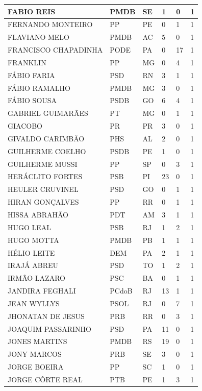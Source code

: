 \begin{apendicesenv}
\begin{longtable}{|L{4cm}|C{2cm}|C{1cm}|C{2cm}|C{1cm}|C{2cm}|}
FABIO REIS & PMDB & SE & 1 & 0 & 1 \\ \hline
FERNANDO MONTEIRO & PP & PE & 0 & 1 & 1 \\ \hline
FLAVIANO MELO & PMDB & AC & 5 & 0 & 1 \\ \hline
FRANCISCO CHAPADINHA & PODE & PA & 0 & 17 & 1 \\ \hline
FRANKLIN & PP & MG & 0 & 4 & 1 \\ \hline
FÁBIO FARIA & PSD & RN & 3 & 1 & 1 \\ \hline
FÁBIO RAMALHO & PMDB & MG & 3 & 0 & 1 \\ \hline
FÁBIO SOUSA & PSDB & GO & 6 & 4 & 1 \\ \hline
GABRIEL GUIMARÃES & PT & MG & 0 & 1 & 1 \\ \hline
GIACOBO & PR & PR & 3 & 0 & 1 \\ \hline
GIVALDO CARIMBÃO & PHS & AL & 2 & 0 & 1 \\ \hline
GUILHERME COELHO & PSDB & PE & 1 & 0 & 1 \\ \hline
GUILHERME MUSSI & PP & SP & 0 & 3 & 1 \\ \hline
HERÁCLITO FORTES & PSB & PI & 23 & 0 & 1 \\ \hline
HEULER CRUVINEL & PSD & GO & 0 & 1 & 1 \\ \hline
HIRAN GONÇALVES & PP & RR & 0 & 1 & 1 \\ \hline
HISSA ABRAHÃO & PDT & AM & 3 & 1 & 1 \\ \hline
HUGO LEAL & PSB & RJ & 1 & 2 & 1 \\ \hline
HUGO MOTTA & PMDB & PB & 1 & 1 & 1 \\ \hline
HÉLIO LEITE & DEM & PA & 2 & 1 & 1 \\ \hline
IRAJÁ ABREU & PSD & TO & 1 & 2 & 1 \\ \hline
IRMÃO LAZARO & PSC & BA & 0 & 1 & 1 \\ \hline
JANDIRA FEGHALI & PCdoB & RJ & 13 & 1 & 1 \\ \hline
JEAN WYLLYS & PSOL & RJ & 0 & 7 & 1 \\ \hline
JHONATAN DE JESUS & PRB & RR & 0 & 3 & 1 \\ \hline
JOAQUIM PASSARINHO & PSD & PA & 11 & 0 & 1 \\ \hline
JONES MARTINS & PMDB & RS & 19 & 0 & 1 \\ \hline
JONY MARCOS & PRB & SE & 3 & 0 & 1 \\ \hline
JORGE BOEIRA & PP & SC & 1 & 0 & 1 \\ \hline
JORGE CÔRTE REAL & PTB & PE & 1 & 3 & 1 \\ \hline

\end{longtable}
\end{apendicesenv}
